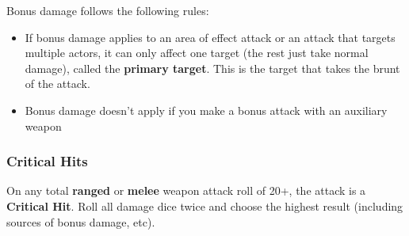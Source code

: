Bonus damage follows the following rules:
\begin{itemize}
     \item If bonus damage applies to an area of effect attack or an attack that targets multiple actors, it can only affect one target (the rest just take normal damage), called the \textbf{primary target}. This is the target that takes the brunt of the attack.
     \item Bonus damage doesn't apply if you make a bonus attack with an auxiliary weapon
\end{itemize}

\subsubsection{Critical Hits}
On any total \textbf{ranged} or \textbf{melee} weapon attack roll of 20+, the attack is a \textbf{Critical Hit}. Roll all damage dice twice and choose the highest result (including sources of bonus damage, etc).
